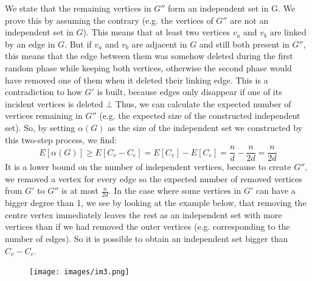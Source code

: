 \documentclass[10pt]{article}
\newenvironment{exercise}[2][Exercise]{\begin{trivlist}
  \item[\hskip \labelsep {\bfseries #1}\hskip \labelsep {\bfseries #2.}]}{\end{trivlist}}
\begin{document}
\begin{exercise}{1b}
  We state that the remaining vertices in $G''$ form an independent set in G. We prove this by assuming the contrary (e.g. the vertices of $G''$ are not an independent set in $G$). This means that at least two vertices $v_a$ and $v_b$ are linked by an edge in $G$. But if $v_a$ and $v_b$ are adjacent in $G$ and still both present in $G''$, this means that the edge between them was somehow deleted during the first random phase while keeping both vertices, otherwise the second phase would have removed one of them when it deleted their linking edge. This is a contradiction to how $G'$ is built, because edges only disappear if one of its incident vertices is deleted $\bot$ \newline
  Thus, we can calculate the expected number of vertices remaining in $G''$ (e.g. the expected size of the constructed independent set). So, by setting $\alpha(G)$ as the size of the independent set we constructed by this two-step process, we find: 
  \begin{equation}
      E[\alpha(G)] \geq E[C_v-C_e] = E[C_v]-E[C_e]=\frac{n}{d}-\frac{n}{2d} = \frac{n}{2d}
  \end{equation}
  It is a lower bound on the number of independent vertices, because to create $G''$, we removed a vertex for every edge so the expected number of removed vertices from $G'$ to $G''$ is at most $\frac{n}{2d}$. In the case where some vertices in $G'$ can have a bigger degree than 1, we see by looking at the example below,    that removing the centre vertex immediately leaves the rest as an independent set with more vertices than if we had removed the outer vertices (e.g. corresponding to the number of edges). So it is possible to obtain an independent set bigger than $C_v-C_e$.
   \begin{figure}[h]
  \texttt{[image: images/im3.png]}
  \centering
  \end{figure}
  \end{exercise}
 
\end{document}
